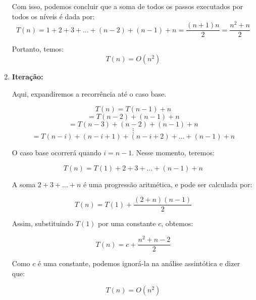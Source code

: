 \begin{enumerate}
	      \FloatBarrier

	      Com isso, podemos concluir que a soma de todos os passos executados por todos os níveis é dada por:
	      \[
		      T(n) = 1 + 2 + 3 + \ldots + (n - 2) + (n - 1) + n = \frac{(n + 1) n}{2} = \frac{n^2 + n}{2}
	      \]

	      Portanto, temos:
	      \[
		      T(n) = O(n^2)
	      \]

	\item \textbf{Iteração:}

	      Aqui, expandiremos a recorrência até o caso base.

	      \[
		      T(n) = T(n-1) + n
	      \]
	      \[
		      = T(n-2) + (n - 1) + n
	      \]
	      \[
		      = T(n-3) + (n - 2) + (n - 1) + n
	      \]
	      \[
		      \vdots
	      \]
	      \[
		      = T(n-i) + (n - i + 1) + (n - i + 2) + \dots + (n - 1) + n
	      \]

	      O caso base ocorrerá quando \( i = n - 1 \). Nesse momento, teremos:

	      \[
		      T(n) = T(1) + 2 + 3 + \dots + (n - 1) + n
	      \]

	      A soma \( 2 + 3 + \dots + n \) é uma progressão aritmética, e pode ser calculada por:

	      \[
		      T(n) = T(1) + \frac{(2 + n)(n - 1)}{2}
	      \]

	      Assim, substituindo \( T(1) \) por uma constante \( c \), obtemos:

	      \[
		      T(n) = c + \frac{n^2 + n - 2}{2}
	      \]

	      Como \( c \) é uma constante, podemos ignorá-la na análise assintótica e dizer que:

	      \[
		      T(n) = O(n^2)
	      \]


\end{enumerate}







